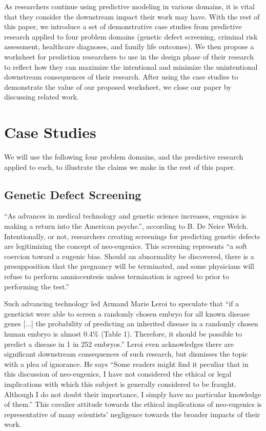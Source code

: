 \documentclass[12pt]{article}
\begin{document}
As researchers continue using predictive modeling in various domains, it is vital that they consider the downstream impact their work may have. With the rest of this paper, we introduce a set of demonstrative case studies from predictive research applied to four problem domains (genetic defect screening, criminal risk assessment, healthcare diagnoses, and family life outcomes). We then propose a worksheet for prediction researchers to use in the design phase of their research to reflect how they can maximize the intentional and minimize the unintentional downstream consequences of their research. After using the case studies to demonstrate the value of our proposed worksheet, we close our paper by discussing related work. 

\section{Case Studies}
    
    We will use the following four problem domains, and the predictive research applied to each, to illustrate the claims we make in the rest of this paper. 

    \subsection{Genetic Defect Screening}
    
        ``As advances in medical technology and genetic science increases, eugenics is making a return into the American psyche.'', according to B. De Neice Welch. Intentionally, or not, researchers creating screenings for predicting genetic defects are legitimizing the concept of neo-eugenics. This screening represents ``a soft coercion toward a eugenic bias. Should an abnormality be discovered, there is a presupposition that the pregnancy will be terminated, and some physicians will refuse to perform amniocentesis unless termination is agreed to prior to performing the test.'' \cite{welchPhD} 

        Such advancing technology led Armand Marie Leroi to speculate that ``if a geneticist were able to screen a randomly chosen embryo for all known disease genes [...]  the probability of predicting an inherited disease in a randomly chosen human embryo is almost 0.4\% (Table 1). Therefore, it should be possible to predict a disease in 1 in 252 embryos.''\cite{neoeugenics} Leroi even acknowledges there are significant downstream consequences of such research, but dismisses the topic with a plea of ignorance. He says ``Some readers might find it peculiar that in this discussion of neo-eugenics, I have not considered the ethical or legal implications with which this subject is generally considered to be fraught. Although I do not doubt their importance, I simply have no particular knowledge of them.'' This cavalier attitude towards the ethical implications of neo-eugenics is representative of many scientists' negligence towards the broader impacts of their work. 
\end{document}
